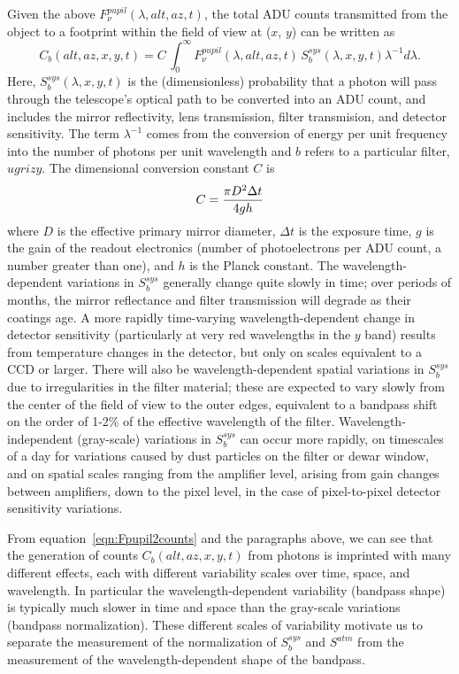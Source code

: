 \documentclass[12pt,preprint]{aastex}
\begin{document}
Given the above $F_\nu^{pupil}(\lambda,alt,az,t)$, the total ADU
counts transmitted from the object to a footprint within the field of
view at ($x$, $y$) can be written as
\begin{equation}
\label{eqn:Fpupil2counts}
    C_b(alt, az, x,y,t) = C \, \int_0^\infty {F_\nu^{pupil}(\lambda,alt,az,t) \, S_b^{sys}(\lambda,x,y,t) \lambda^{-1}d\lambda}.
\end{equation}
Here, $S_b^{sys}(\lambda,x,y,t)$ is the (dimensionless) probability
that a photon will pass through the telescope's optical path to be
converted into an ADU count, and 
includes the mirror reflectivity, lens transmission, filter
transmision, and detector sensitivity. The term
$\lambda^{-1}$ comes from the conversion of energy per unit frequency
into the number of photons per unit wavelength and $b$ refers to a particular filter, $ugrizy$. The
dimensional conversion constant $C$ is
\begin{equation}
\label{eqn:Cconstant}
        C = {\pi D^2 \Delta t \over 4 g h }  
\end{equation}
where $D$ is the effective primary mirror diameter, $\Delta t$ is the
exposure time, $g$ is the gain of the readout electronics (number of
photoelectrons per ADU count, a number greater than one), and $h$ is
the Planck constant. The wavelength-dependent variations in
$S_b^{sys}$ generally change quite slowly in time; over periods of
months, the mirror reflectance and filter transmission will degrade as
their coatings age. A more rapidly time-varying wavelength-dependent
change in detector sensitivity (particularly at very red wavelengths
in the $y$ band) results from temperature changes in the detector, but
only on scales equivalent to a CCD or larger.  There will also be
wavelength-dependent spatial variations in $S_b^{sys}$ due to
irregularities in the filter material; these are expected to vary
slowly from the center of the field of view to the outer edges,
equivalent to a bandpass shift on the order of 1-2\% of the effective
wavelength of the filter. Wavelength-independent (gray-scale)
variations in $S_b^{sys}$ can occur more rapidly, on timescales of a
day for variations caused by dust particles on the filter or dewar
window, and on spatial scales ranging from the amplifier level,
arising from gain changes between amplifiers, down to the pixel level,
in the case of pixel-to-pixel detector sensitivity variations.

From equation~\ref{eqn:Fpupil2counts} and the paragraphs above, we can
see that the generation of counts $C_b(alt,az,x,y,t)$ from photons is
imprinted with many different effects, each with different variability
scales over time, space, and wavelength. In particular the
wavelength-dependent variability (bandpass shape) is
typically much slower in time and space than the gray-scale variations
(bandpass normalization). These different scales of variability
motivate us to separate the measurement of the normalization of
$S_b^{sys}$ and $S^{atm}$ from the measurement of the
wavelength-dependent shape of the bandpass.
\end{document}
